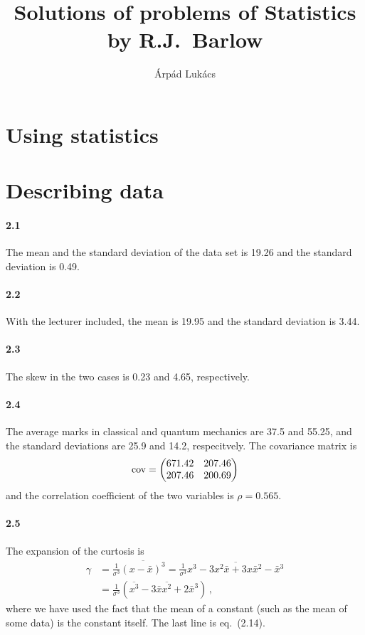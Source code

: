 \documentclass[a4paper,12pt]{article}
\title{Solutions of problems of Statistics by R.J.~Barlow}
\author{Árpád Lukács}
\begin{document}
\maketitle

\section{Using statistics}\label{sec:UsingStatistics}

\section{Describing data}\label{sec:DescribingData}

\paragraph{2.1} The mean and the standard deviation of the data set is 19.26 and the standard deviation is 0.49.

\paragraph{2.2} With the lecturer included, the mean is 19.95 and the standard deviation is 3.44.

\paragraph{2.3} The skew in the two cases is 0.23 and 4.65, respectively.

\paragraph{2.4} The average marks in classical and quantum mechanics are 37.5 and 55.25, and the standard deviations are 25.9 and 14.2, respecitvely. The covariance matrix is
\[
 {\rm cov} =
 \begin{pmatrix}
 671.42 & 207.46\\
 207.46 & 200.69
 \end{pmatrix}
\]
and the correlation coefficient of the two variables is $\rho = 0.565$.

\paragraph{2.5} The expansion of the curtosis is
\[
 \begin{aligned}
  \gamma &= \frac{1}{\sigma^3} \overline{(x-\bar{x})^3} = \frac{1}{\sigma^3}\overline{x^3 - 3 x^2\bar{x} + 3 x\bar{x}{}^2 - \bar{x}{}^3}\\
  &= \frac{1}{\sigma^3}(\overline{x^3}-3\bar{x}\overline{x^2} + 2\bar{x}^3)\,,
 \end{aligned}
\]
where we have used the fact that the mean of a constant (such as the mean of some data) is the constant itself. The last line is eq.\ (2.14).
\end{document}

